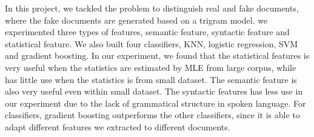 In this project, we tackled the problem to distinguish real and fake documents, where the fake documents are generated based on a trigram model. we experimented three types of features, semantic feature, syntactic feature and statistical feature. We also built four classifiers, KNN, logistic regression, SVM and gradient boosting. In our experiment, we found that the statistical features is very useful when the statistics are estimated by MLE from large corpus, while has little use when the statistics is from small dataset. The semantic feature is also very useful even within small dataset. The syntactic features has less use in our experiment due to the lack of grammatical structure in spoken language. For classifiers, gradient boosting outperforms the other classifiers, since it is able to adapt different features we extracted to different documents. 